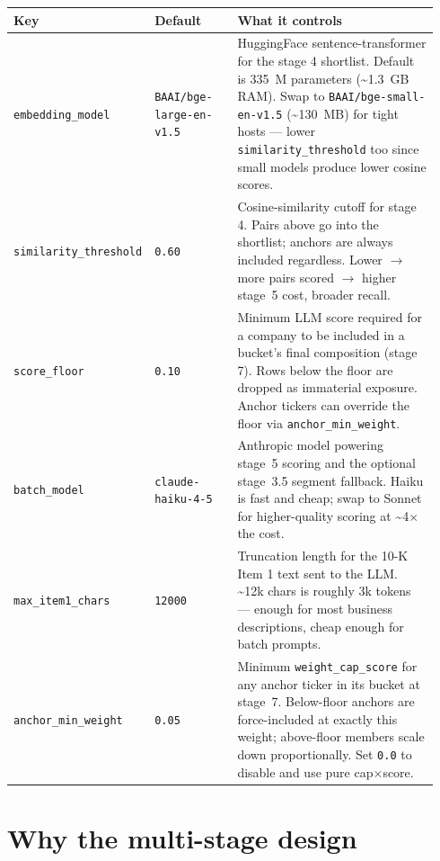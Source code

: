 \documentclass[11pt,a4paper,oneside]{article}
\begin{document}
\begin{center}
\begin{tabular}{@{}p{0.24\linewidth} p{0.20\linewidth} p{0.50\linewidth}@{}}
\toprule
\textbf{Key} & \textbf{Default} & \textbf{What it controls} \\
\midrule
\texttt{embedding\_model} & \texttt{BAAI/bge-large-en-v1.5} & HuggingFace sentence-transformer for the stage 4 shortlist. Default is 335~M parameters (\textasciitilde 1.3~GB RAM). Swap to \texttt{BAAI/bge-small-en-v1.5} (\textasciitilde 130~MB) for tight hosts --- lower \texttt{similarity\_threshold} too since small models produce lower cosine scores. \\
\texttt{similarity\_threshold} & \texttt{0.60} & Cosine-similarity cutoff for stage 4. Pairs above go into the shortlist; anchors are always included regardless. Lower \(\rightarrow\) more pairs scored \(\rightarrow\) higher stage~5 cost, broader recall. \\
\texttt{score\_floor} & \texttt{0.10} & Minimum LLM score required for a company to be included in a bucket's final composition (stage 7). Rows below the floor are dropped as immaterial exposure. Anchor tickers can override the floor via \texttt{anchor\_min\_weight}. \\
\texttt{batch\_model} & \texttt{claude-haiku-4-5} & Anthropic model powering stage~5 scoring and the optional stage~3.5 segment fallback. Haiku is fast and cheap; swap to Sonnet for higher-quality scoring at \textasciitilde 4\(\times\) the cost. \\
\texttt{max\_item1\_chars} & \texttt{12000} & Truncation length for the 10-K Item 1 text sent to the LLM. \textasciitilde 12k chars is roughly 3k tokens --- enough for most business descriptions, cheap enough for batch prompts. \\
\texttt{anchor\_min\_weight} & \texttt{0.05} & Minimum \texttt{weight\_cap\_score} for any anchor ticker in its bucket at stage~7. Below-floor anchors are force-included at exactly this weight; above-floor members scale down proportionally. Set \texttt{0.0} to disable and use pure cap\(\times\)score. \\
\bottomrule
\end{tabular}
\end{center}

\section{Why the multi-stage design}
\end{document}
